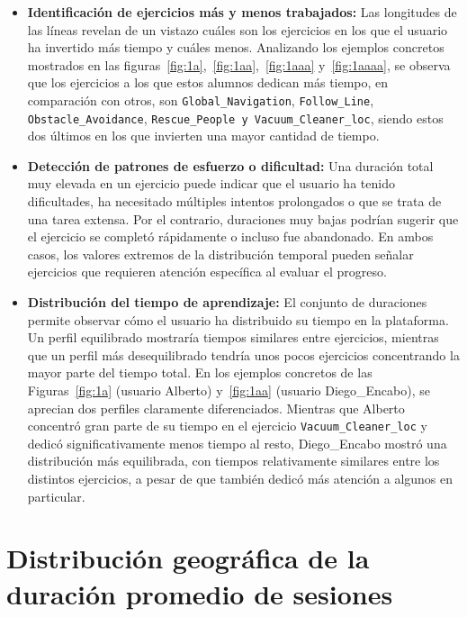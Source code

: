 \documentclass[a4paper, 12pt]{book}
\begin{document}
\begin{itemize}
  \item \textbf{Identificación de ejercicios más y menos trabajados:} Las longitudes de las líneas revelan de un vistazo cuáles son los ejercicios en los que el usuario ha invertido más tiempo y cuáles menos.
  Analizando los ejemplos concretos mostrados en las figuras~\ref{fig:1a},~\ref{fig:1aa},~\ref{fig:1aaa} y~\ref{fig:1aaaa},  se observa que los ejercicios a los que estos alumnos dedican más tiempo, en comparación con otros, son \texttt{Global\_Navigation}, \texttt{Follow\_Line}, \texttt{Obstacle\_Avoidance}, \texttt{Rescue\_People y Vacuum\_Cleaner\_loc}, siendo estos dos últimos en los que invierten una mayor cantidad de tiempo.

  \item \textbf{Detección de patrones de esfuerzo o dificultad:} Una duración total muy elevada en un ejercicio puede indicar que el usuario ha tenido dificultades, ha necesitado múltiples intentos prolongados o que se trata de una tarea extensa. Por el contrario, duraciones muy bajas podrían sugerir que el ejercicio se completó rápidamente o incluso fue abandonado. En ambos casos, los valores extremos de la distribución temporal pueden señalar ejercicios que requieren atención específica al evaluar el progreso.

  \item \textbf{Distribución del tiempo de aprendizaje:} El conjunto de duraciones permite observar cómo el usuario ha distribuido su tiempo en la plataforma. Un perfil equilibrado mostraría tiempos similares entre ejercicios, mientras que un perfil más desequilibrado tendría unos pocos ejercicios concentrando la mayor parte del tiempo total.
  En los ejemplos concretos de las Figuras~\ref{fig:1a} (usuario Alberto) y~\ref{fig:1aa} (usuario Diego\_Encabo), se aprecian dos perfiles claramente diferenciados. Mientras que Alberto concentró gran parte de su tiempo en el ejercicio \texttt{Vacuum\_Cleaner\_loc} y dedicó significativamente menos tiempo al resto, Diego\_Encabo mostró una distribución más equilibrada, con tiempos relativamente similares entre los distintos ejercicios, a pesar de que también dedicó más atención a algunos en particular.
\end{itemize}



\section{Distribución geográfica de la duración promedio de sesiones}
\label{sec:dash1c}
\end{document}
